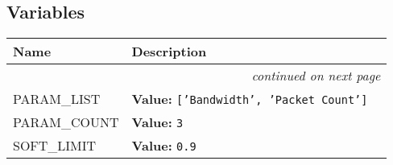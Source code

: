   \subsection{Variables}

    \vspace{-1cm}
\hspace{\varindent}\begin{longtable}{|p{\varnamewidth}|p{\vardescrwidth}|l}
\cline{1-2}
\cline{1-2} \centering \textbf{Name} & \centering \textbf{Description}& \\
\cline{1-2}
\endhead\cline{1-2}\multicolumn{3}{r}{\small\textit{continued on next page}}\\\endfoot\cline{1-2}
\endlastfoot\raggedright P\-A\-R\-A\-M\-\_\-L\-I\-S\-T\- & \raggedright \textbf{Value:} 
{\tt ['Bandwidth', 'Packet Count']}&\\
\cline{1-2}
\raggedright P\-A\-R\-A\-M\-\_\-C\-O\-U\-N\-T\- & \raggedright \textbf{Value:} 
{\tt 3}&\\
\cline{1-2}
\raggedright S\-O\-F\-T\-\_\-L\-I\-M\-I\-T\- & \raggedright \textbf{Value:} 
{\tt 0.9}&\\
\cline{1-2}
\end{longtable}

